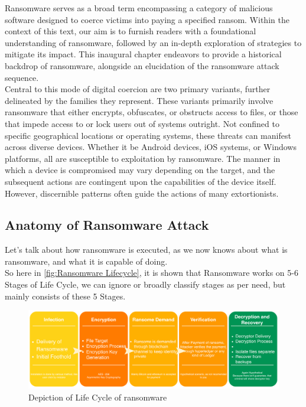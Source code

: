 \documentclass[12pt,letterpaper]{article}
\begin{document}
    Ransomware serves as a broad term encompassing a category of malicious software designed to coerce victims into paying a specified ransom. Within the context of this text, our aim is to furnish readers with a foundational understanding of ransomware, followed by an in-depth exploration of strategies to mitigate its impact. This inaugural chapter endeavors to provide a historical backdrop of ransomware, alongside an elucidation of the ransomware attack sequence.
    \\
    Central to this mode of digital coercion are two primary variants, further delineated by the families they represent. These variants primarily involve ransomware that either encrypts, obfuscates, or obstructs access to files, or those that impede access to or lock users out of systems outright. Not confined to specific geographical locations or operating systems, these threats can manifest across diverse devices. Whether it be Android devices, iOS systems, or Windows platforms, all are susceptible to exploitation by ransomware. The manner in which a device is compromised may vary depending on the target, and the subsequent actions are contingent upon the capabilities of the device itself. However, discernible patterns often guide the actions of many extortionists.

    \subsection{Anatomy of Ransomware Attack}

    Let's talk about how ransomware is executed, as we now knows about what is ransomware, and what it is capable of doing. \\ So here in \autoref{fig:Ransomware Lifecycle}, it is shown that Ransomware works on 5-6 Stages of Life Cycle, we can ignore or broadly classify stages as per need, but mainly consists of these 5 Stages.\cite{liska2016ransomware}

        \begin{figure}[ht]
            \centering
            \includegraphics[width=\textwidth]{images/lifecycle.pdf}
            \caption{Depiction of Life Cycle of ransomware}
            \label{fig:Ransomware Lifecycle}
        \end{figure}
        
\end{document}
